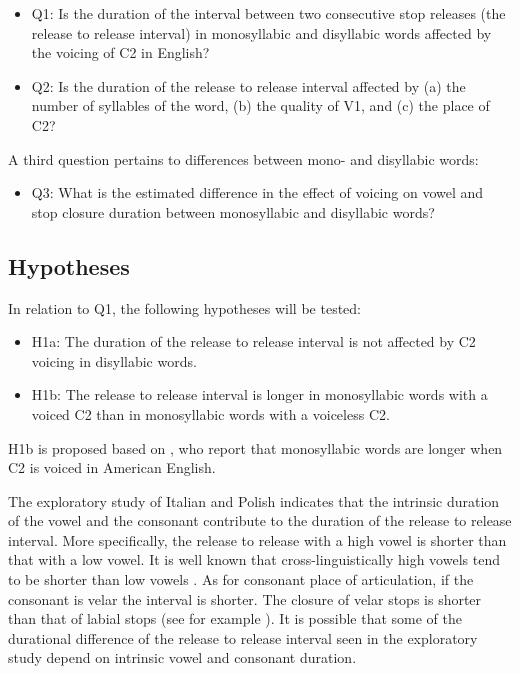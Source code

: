 \documentclass[11pt,]{article}
\providecommand{\tightlist}{%
  \setlength{\itemsep}{0pt}\setlength{\parskip}{0pt}}
\begin{document}
\begin{itemize}
\tightlist
\item
  Q1: Is the duration of the interval between two consecutive stop
  releases (the release to release interval) in monosyllabic and
  disyllabic words affected by the voicing of C2 in English?
\item
  Q2: Is the duration of the release to release interval affected by (a)
  the number of syllables of the word, (b) the quality of V1, and (c)
  the place of C2?
\end{itemize}

A third question pertains to differences between mono- and disyllabic
words:

\begin{itemize}
\tightlist
\item
  Q3: What is the estimated difference in the effect of voicing on vowel
  and stop closure duration between monosyllabic and disyllabic words?
\end{itemize}

\subsection{Hypotheses}\label{hypotheses}

In relation to Q1, the following hypotheses will be tested:

\begin{itemize}
\tightlist
\item
  H1a: The duration of the release to release interval is not affected
  by C2 voicing in disyllabic words.
\item
  H1b: The release to release interval is longer in monosyllabic words
  with a voiced C2 than in monosyllabic words with a voiceless C2.
\end{itemize}

H1b is proposed based on \citet{jacewicz2009}, who report that
monosyllabic words are longer when C2 is voiced in American English.

The exploratory study of Italian and Polish indicates that the intrinsic
duration of the vowel and the consonant contribute to the duration of
the release to release interval. More specifically, the release to
release with a high vowel is shorter than that with a low vowel. It is
well known that cross-linguistically high vowels tend to be shorter than
low vowels
\citep{hertrich1997, esposito2002, mortensen2013, toivonen2015, kawahara2017}.
As for consonant place of articulation, if the consonant is velar the
interval is shorter. The closure of velar stops is shorter than that of
labial stops (see for example \citealt{sharf1962}). It is possible that
some of the durational difference of the release to release interval
seen in the exploratory study depend on intrinsic vowel and consonant
duration.
\end{document}
